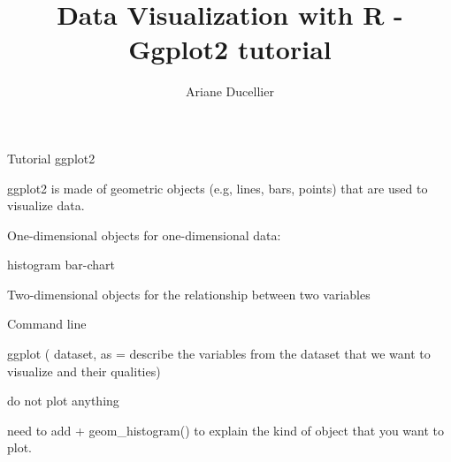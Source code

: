 \documentclass{beamer}
\title[Ggplot2 tutorial]{Data Visualization with R - Ggplot2 tutorial}
\author{Ariane Ducellier}
\begin{document}
	\begin{frame}
		\titlepage
	\end{frame}

	\begin{frame}

Tutorial ggplot2

ggplot2 is made of geometric objects (e.g, lines, bars, points) that are used to visualize data.

One-dimensional objects for one-dimensional data:

histogram
bar-chart

Two-dimensional objects for the relationship between two variables

Command line

ggplot ( dataset, as = describe the variables from the dataset that we want to visualize and their qualities)

do not plot anything

need to add + geom\_histogram() to explain the kind of object that you want to plot.

	\end{frame}
\end{document}
